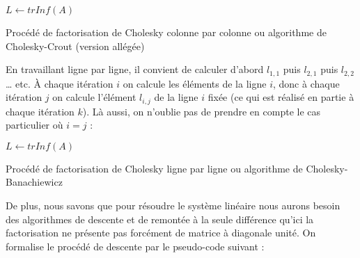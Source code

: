 \documentclass[a4paper, titlepage]{livret}													%
\begin{document}
			\begin{algorithm}[H]
				$L \gets trInf(A)$ \\
				\caption{Procédé de factorisation de Cholesky colonne par colonne ou algorithme de Cholesky-Crout (version allégée)}
			\end{algorithm}

			En travaillant ligne par ligne, il convient de calculer d'abord $l_{1,1}$ puis $l_{2,1}$ puis $l_{2,2}$… etc. À chaque itération $i$ on calcule les éléments de la ligne $i$, donc à chaque itération $j$ on calcule l'élément $l_{i,j}$ de la ligne $i$ fixée (ce qui est réalisé en partie à chaque itération $k$).
			Là aussi, on n'oublie pas de prendre en compte le cas particulier où $i = j$ : 

			\begin{algorithm}[H]
				$L \gets trInf(A)$ \\
				\caption{Procédé de factorisation de Cholesky ligne par ligne ou algorithme de Cholesky-Banachiewicz}
			\end{algorithm}

			De plus, nous savons que pour résoudre le système linéaire nous aurons besoin des algorithmes de descente et de remontée à la seule différence qu'ici la factorisation ne présente pas forcément de matrice à diagonale unité.
			On formalise le procédé de descente par le pseudo-code suivant :
\end{document}
